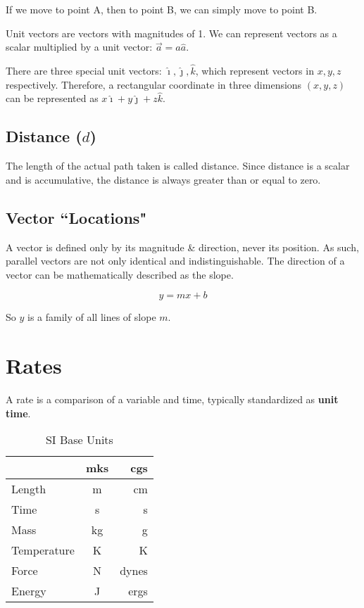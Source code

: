 \documentclass[letterpaper]{article}
\begin{document}
If we move to point A, then to point B, we can simply move to point B.

Unit vectors are vectors with magnitudes of 1.
We can represent vectors as a scalar multiplied by a unit vector:
$\vec{a} = a \hat{a}$.

There are three special unit vectors: $\hat{\imath}, \hat{\jmath}, \hat{k}$, which
represent vectors in $x, y, z$ respectively. Therefore, a rectangular
coordinate in three dimensions $(x, y, z)$ can be represented as
$x\hat{\imath} + y\hat{\jmath} + z\hat{k}$.

\subsection{Distance ($d$)}
The length of the actual path taken is called distance.
Since distance is a scalar and is accumulative, the distance is always
greater than or equal to zero.

\subsection{Vector ``Locations"}

A vector is defined only by its magnitude \& direction, never its position.
As such, parallel vectors are not only identical and indistinguishable. 
The direction of a vector can be mathematically described as the slope.

\[
    y = mx + b
\]

So $y$ is a family of all lines of slope $m$.

\section{Rates}

A rate is a comparison of a variable and time, typically standardized as
{\bf unit time}.

\begin{table}[ht]\label{SiUnitsTable}
\centering
\caption{SI Base Units}
\begin{tabular}{l| c r} 
    & mks & cgs\\ \hline
    Length & m & cm\\
    Time & s & s\\
    Mass & kg & g\\
    Temperature & K & K\\
    Force & N & dynes\\
    Energy & J & ergs\\
\end{tabular}
\end{table}
\end{document}
